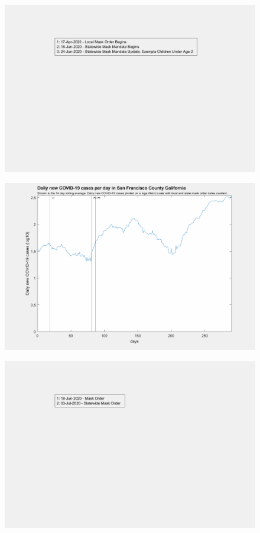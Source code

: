 \documentclass[]{article}
\begin{document}
\begin{figure}[!h]
	\includegraphics[width=\linewidth]{legends/san_francisco_mask_order_legend.png}
	\caption{}
	\label{fig:legends/san_francisco_mask_order_legendLabel}
\end{figure}

\begin{figure}[!h]
	\includegraphics[width=\linewidth]{images/san_francisco_mask_order_log.png}
	\caption{}
	\label{fig:images/san_francisco_mask_order_logLabel}
\end{figure}

\begin{figure}[!h]
	\includegraphics[width=\linewidth]{legends/travis_mask_order_legend.png}
	\caption{}
	\label{fig:legends/travis_mask_order_legendLabel}
\end{figure}
\end{document}
